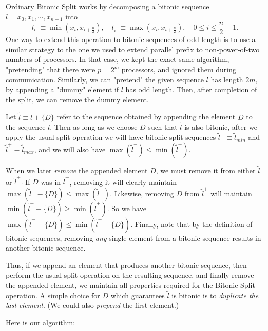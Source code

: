 \documentclass{article}
\begin{document}
\quad Ordinary Bitonic Split works by decomposing a bitonic sequence $l = x_0, x_1, \cdots, x_{n-1}$ into
$$l^{-}_i \equiv \min{(x_i, x_{i + \frac{n}{2}})},\quad l^{+}_i \equiv \max{(x_i, x_{i + \frac{n}{2}})},\quad 0 \leq i \leq \frac{n}{2} - 1.$$
One way to extend this operation to bitonic sequences of odd length is to use a similar strategy to the one we used to extend parallel prefix to non-power-of-two numbers of processors.
In that case, we kept the exact same algorithm, "pretending" that there were $p = 2^{m}$ processors, and ignored them during communication.
Similarly, we can "pretend" the given sequence $l$ has length $2m$, by appending a "dummy" element if $l$ has odd length.
Then, after completion of the split, we can remove the dummy element.

Let $\tilde{l} \equiv l + \{D\}$ refer to the sequence obtained by appending the element $D$ to the sequence $l$.
Then as long as we choose $D$ such that $\tilde{l}$ is also bitonic, after we apply the usual split operation we will have bitonic split sequences $\tilde{l}^{-} \equiv \tilde{l}_{min}$ and $\tilde{l}^{+} \equiv \tilde{l}_{max}$, and we will also have $\max{(\tilde{l}^{-})} \leq \min{(\tilde{l}^{+})}.$

When we later \textit{remove} the appended element $D$, we must remove it from either $\tilde{l}^{-}$ or $\tilde{l}^{+}.$
If $D$ was in $\tilde{l}^{-}$, removing it will clearly maintain $\max\left(\tilde{l}^{-} - \{D\}\right) \leq \max\left(\tilde{l}^{-}\right)$.
Likewise, removing $D$ from $\tilde{l}^{+}$ will maintain $\min\left(\tilde{l}^{+} - \{D\}\right) \geq \min\left(\tilde{l}^{+}\right)$.
So we have $\max\left(\tilde{l}^{-} - \{D\}\right) \leq \min\left(\tilde{l}^{+} - \{D\}\right).$
Finally, note that by the definition of bitonic sequences, removing \textit{any} single element from a bitonic sequence results in another bitonic sequence.

Thus, if we append an element that produces another bitonic sequence, then perform the usual split operation on the resulting sequence, and finally remove the appended element, we maintain all properties required for the Bitonic Split operation.
A simple choice for $D$ which guarantees $\tilde{l}$ is bitonic is to \textit{duplicate the last element}.
(We could also \textit{prepend} the first element.)

Here is our algorithm:
\end{document}
